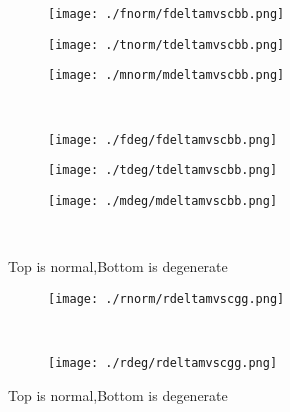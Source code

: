 \documentclass[aps,floats,floatfix,nofootinbib]{revtex4-1}
\begin{document}
\begin{center}
\begin{figure}
\begin{subfigure}{0.3\textwidth}
\texttt{[image: ./fnorm/fdeltamvscbb.png]}
\label{}
\end{subfigure}
\begin{subfigure}{0.3\textwidth}
\texttt{[image: ./tnorm/tdeltamvscbb.png]}
\label{}
\end{subfigure}
\begin{subfigure}{0.3\textwidth}
\texttt{[image: ./mnorm/mdeltamvscbb.png]}
\label{}
\end{subfigure}\\
\begin{subfigure}{0.3\textwidth}
\texttt{[image: ./fdeg/fdeltamvscbb.png]}
\label{}
\end{subfigure}
\begin{subfigure}{0.3\textwidth}
\texttt{[image: ./tdeg/tdeltamvscbb.png]}
\label{}
\end{subfigure}
\begin{subfigure}{0.3\textwidth}
\texttt{[image: ./mdeg/mdeltamvscbb.png]}
\label{}
\end{subfigure}\\
\caption{Top is normal,Bottom is degenerate}
\end{figure}
\end{center}

\begin{center}
\begin{figure}
\begin{subfigure}{0.95\textwidth}
\texttt{[image: ./rnorm/rdeltamvscgg.png]}
\label{}
\end{subfigure}\\
\begin{subfigure}{0.95\textwidth}
\texttt{[image: ./rdeg/rdeltamvscgg.png]}
\label{}
\end{subfigure}
\caption{Top is normal,Bottom is degenerate}
\end{figure}
\end{center}
\end{document}
